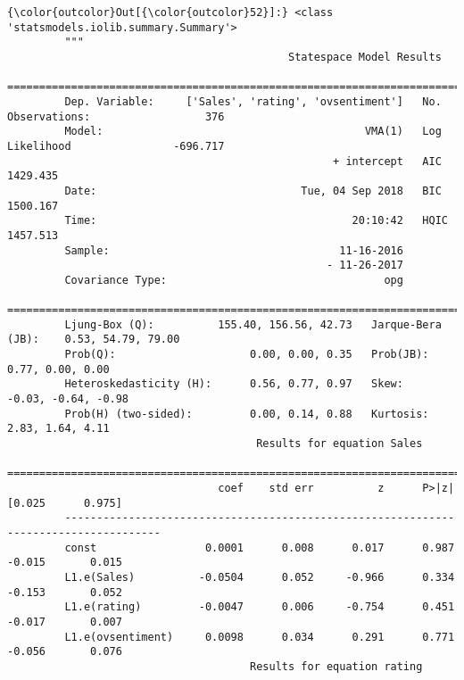 \documentclass[11pt]{article}
\begin{document}
\begin{Verbatim}[commandchars=\\\{\}]
{\color{outcolor}Out[{\color{outcolor}52}]:} <class 'statsmodels.iolib.summary.Summary'>
         """
                                            Statespace Model Results                                   
         ==============================================================================================
         Dep. Variable:     ['Sales', 'rating', 'ovsentiment']   No. Observations:                  376
         Model:                                         VMA(1)   Log Likelihood                -696.717
                                                   + intercept   AIC                           1429.435
         Date:                                Tue, 04 Sep 2018   BIC                           1500.167
         Time:                                        20:10:42   HQIC                          1457.513
         Sample:                                    11-16-2016                                         
                                                  - 11-26-2017                                         
         Covariance Type:                                  opg                                         
         =======================================================================================
         Ljung-Box (Q):          155.40, 156.56, 42.73   Jarque-Bera (JB):    0.53, 54.79, 79.00
         Prob(Q):                     0.00, 0.00, 0.35   Prob(JB):              0.77, 0.00, 0.00
         Heteroskedasticity (H):      0.56, 0.77, 0.97   Skew:               -0.03, -0.64, -0.98
         Prob(H) (two-sided):         0.00, 0.14, 0.88   Kurtosis:              2.83, 1.64, 4.11
                                       Results for equation Sales                             
         =====================================================================================
                                 coef    std err          z      P>|z|      [0.025      0.975]
         -------------------------------------------------------------------------------------
         const                 0.0001      0.008      0.017      0.987      -0.015       0.015
         L1.e(Sales)          -0.0504      0.052     -0.966      0.334      -0.153       0.052
         L1.e(rating)         -0.0047      0.006     -0.754      0.451      -0.017       0.007
         L1.e(ovsentiment)     0.0098      0.034      0.291      0.771      -0.056       0.076
                                      Results for equation rating                             

\end{Verbatim}
\end{document}
